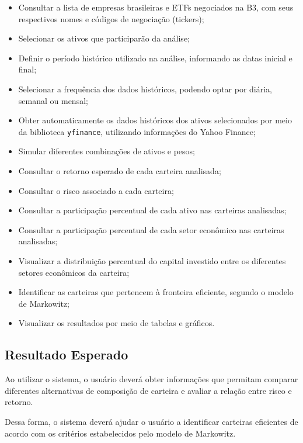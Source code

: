 \begin{itemize}
    \item Consultar a lista de empresas brasileiras e ETFs negociados na B3,
    com seus respectivos nomes e códigos de negociação (tickers);

    \item Selecionar os ativos que participarão da análise;

    \item Definir o período histórico utilizado na análise,
    informando as datas inicial e final;

    \item Selecionar a frequência dos dados históricos, podendo
    optar por diária, semanal ou mensal;

    \item Obter automaticamente os dados históricos dos ativos
    selecionados por meio da biblioteca \texttt{yfinance},
    utilizando informações do Yahoo Finance;

    \item Simular diferentes combinações de ativos e pesos;

    \item Consultar o retorno esperado de cada carteira analisada;

    \item Consultar o risco associado a cada carteira;

    \item Consultar a participação percentual de cada ativo nas carteiras analisadas;

    \item Consultar a participação percentual de cada setor econômico nas carteiras analisadas;

    \item Visualizar a distribuição percentual do capital investido
    entre os diferentes setores econômicos da carteira;

    \item Identificar as carteiras que pertencem à fronteira eficiente, segundo o modelo de Markowitz;

    \item Visualizar os resultados por meio de tabelas e gráficos.
\end{itemize}


\subsection{Resultado Esperado}

Ao utilizar o sistema, o usuário deverá obter informações que
permitam comparar diferentes alternativas de composição de
carteira e avaliar a relação entre risco e retorno.

Dessa forma, o sistema deverá ajudar o usuário a identificar
carteiras eficientes de acordo com os critérios estabelecidos
pelo modelo de Markowitz.



